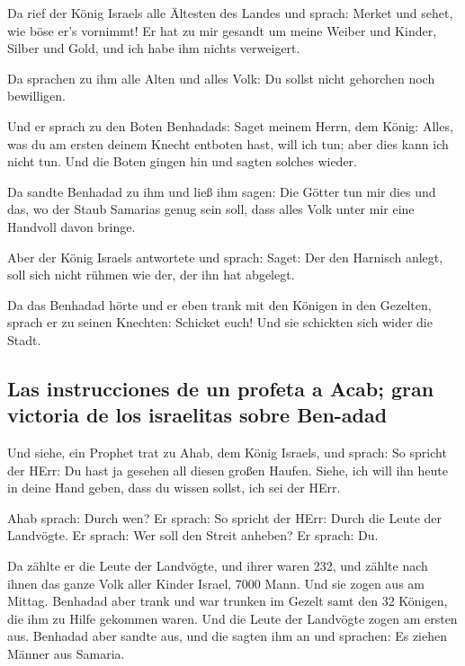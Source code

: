  Da rief der König Israels alle Ältesten des Landes und
sprach: Merket und sehet, wie böse er's vornimmt! Er hat zu mir gesandt
um meine Weiber und Kinder, Silber und Gold, und ich habe ihm nichts
verweigert.

 Da sprachen zu ihm alle Alten und alles Volk: Du sollst
nicht gehorchen noch bewilligen.

 Und er sprach zu den Boten Benhadads: Saget meinem Herrn,
dem König: Alles, was du am ersten deinem Knecht entboten hast, will ich
tun; aber dies kann ich nicht tun. Und die Boten gingen hin und sagten
solches wieder.

 Da sandte Benhadad zu ihm und ließ ihm sagen: Die Götter
tun mir dies und das, wo der Staub Samarias genug sein soll, dass alles
Volk unter mir eine Handvoll davon bringe.

 Aber der König Israels antwortete und sprach: Saget: Der
den Harnisch anlegt, soll sich nicht rühmen wie der, der ihn hat
abgelegt.

 Da das Benhadad hörte und er eben trank mit den Königen
in den Gezelten, sprach er zu seinen Knechten: Schicket euch! Und sie
schickten sich wider die Stadt.

\hypertarget{las-instrucciones-de-un-profeta-a-acab-gran-victoria-de-los-israelitas-sobre-ben-adad}{%
\subsection{Las instrucciones de un profeta a Acab; gran victoria de los
israelitas sobre
Ben-adad}\label{las-instrucciones-de-un-profeta-a-acab-gran-victoria-de-los-israelitas-sobre-ben-adad}}

 Und siehe, ein Prophet trat zu Ahab, dem König Israels,
und sprach: So spricht der HErr: Du hast ja gesehen all diesen großen
Haufen. Siehe, ich will ihn heute in deine Hand geben, dass du wissen
sollst, ich sei der HErr.

 Ahab sprach: Durch wen? Er sprach: So spricht der HErr:
Durch die Leute der Landvögte. Er sprach: Wer soll den Streit anheben?
Er sprach: Du.

 Da zählte er die Leute der Landvögte, und ihrer waren
232, und zählte nach ihnen das ganze Volk aller Kinder Israel, 7000
Mann.  Und sie zogen aus am Mittag. Benhadad aber trank
und war trunken im Gezelt samt den 32 Königen, die ihm zu Hilfe gekommen
waren.  Und die Leute der Landvögte zogen am ersten aus.
Benhadad aber sandte aus, und die sagten ihm an und sprachen: Es ziehen
Männer aus Samaria.

